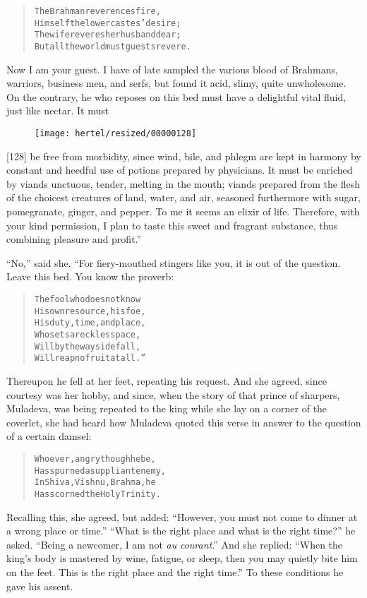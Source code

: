 \documentclass[article, twoside, 10pt]{memoir}
\renewenvironment{verbatim}{%
\begin{quote}%
\vskip -10pt%
\begin{alltt}\normalfont\small}{\end{alltt}%
\end{quote}%
\vskip -10pt
} %
\begin{document}
\begin{verbatim}
The Brahman reverences fire,
Himself the lower castes' desire;
The wife reveres her husband dear;
But all the world must guests revere.
\end{verbatim}
Now I am your guest. I have of late sampled the various blood of
Brahmans, warriors, business men, and serfs, but found it acid,
slimy, quite unwholesome. On the contrary, he who reposes on this
bed must have a delightful vital fluid, just like nectar. It must
\begin{figure}[p]\texttt{[image: hertel/resized/00000128]}\end{figure}[128] be free from morbidity, since wind, bile, and phlegm are kept
in harmony by constant and heedful use of potions prepared by
physicians. It must be enriched by viands unctuous, tender, melting
in the mouth; viands prepared from the flesh of the choicest
creatures of land, water, and air, seasoned furthermore with sugar,
pomegranate, ginger, and pepper. To me it seems an elixir of life.
Therefore, with your kind permission, I plan to taste this sweet
and fragrant substance, thus combining pleasure and profit.”

``No,'' said she. “For fiery-mouthed stingers like you, it is out
of the question. Leave this bed. You know the proverb:

\begin{verbatim}
The fool who does not know
His own resource, his foe,
His duty, time, and place,
Who sets a reckless pace,
Will by the wayside fall,
Will reap no fruit at all.”
\end{verbatim}
Thereupon he fell at her feet, repeating his request. And she
agreed, since courtesy was her hobby, and since, when the story of
that prince of sharpers, Muladeva, was being repeated to the king
while she lay on a corner of the coverlet, she had heard how
Muladeva quoted this verse in answer to the question of a certain
damsel:

\begin{verbatim}
Whoever, angry though he be,
Has spurned a suppliant enemy,
In Shiva, Vishnu, Brahma, he
Has scorned the Holy Trinity.
\end{verbatim}
Recalling this, she agreed, but added:
``However, you must not come to dinner at a wrong place or time.''
``What is the right place and what is the right time?'' he asked.
``Being a newcomer, I am not \emph{au} \emph{courant}.'' And she
replied:
``When the king's body is mastered by wine, fatigue, or sleep, then you may quietly bite him on the feet. This is the right place and the right time.''
To these conditions he gave his assent.
\end{document}
